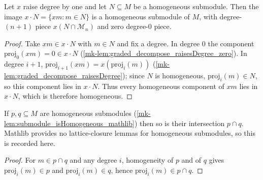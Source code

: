 \begin{lemma}\label{mk-lem:graded_map_isHomogeneous}
  \leanok

  Let \(x\) raise degree by one and let \(N \subseteq M\) be a homogeneous submodule.
  Then the image \(x \cdot N = \{x m : m \in N\}\) is a homogeneous submodule of
  \(M\), with degree-\((n+1)\) piece \(x(N \cap \mathcal{M}_n)\) and zero
  degree-\(0\) piece.
\end{lemma}

\begin{proof}
  \leanok
    Take \(x m \in x \cdot N\) with \(m \in N\) and fix a degree. In degree \(0\) the
  component \(\mathrm{proj}_0(x m) = 0 \in x \cdot N\)
  (\ref{mk-lem:graded_decompose_raisesDegree_zero}). In degree \(i+1\),
  \(\mathrm{proj}_{i+1}(x m) = x(\mathrm{proj}_i(m))\)
  (\ref{mk-lem:graded_decompose_raisesDegree}); since \(N\) is homogeneous,
  \(\mathrm{proj}_i(m) \in N\), so this component lies in \(x \cdot N\). Thus every
  homogeneous component of \(x m\) lies in \(x \cdot N\), which is therefore
  homogeneous.
\end{proof}

\begin{lemma}\label{mk-lem:graded_inf_isHomogeneous}
  \leanok

  If \(p, q \subseteq M\) are homogeneous submodules
  (\ref{mk-lem:submodule_isHomogeneous_mathlib}) then so is their intersection \(p
  \cap q\). Mathlib provides no lattice-closure lemmas for homogeneous submodules, so
  this is recorded here.
\end{lemma}

\begin{proof}
  \leanok
  For \(m \in p \cap q\) and any degree \(i\), homogeneity of \(p\) and of \(q\)
  gives \(\mathrm{proj}_i(m) \in p\) and \(\mathrm{proj}_i(m) \in q\), hence
  \(\mathrm{proj}_i(m) \in p \cap q\).
\end{proof}


